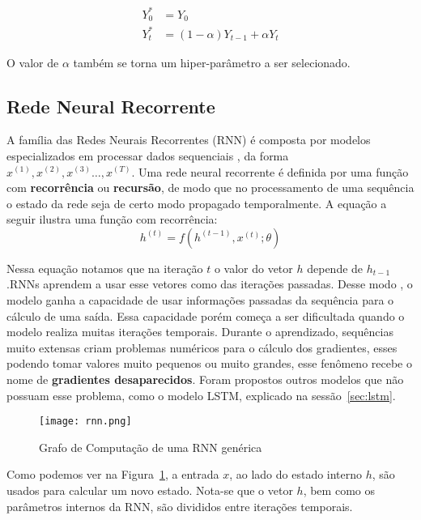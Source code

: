   \begin{align}
  Y^*_0 &= Y_0 \\ 
  Y^*_t &= (1- \alpha)Y_{t-1} + \alpha Y_t 
  \end{align}

  O valor de $\alpha$ também se torna um hiper-parâmetro a ser selecionado.

\subsection{Rede Neural Recorrente}
% 

A família das Redes Neurais Recorrentes (RNN) é composta por modelos especializados
em processar dados sequenciais \citep{dlbook}, da forma $x^{(1)},x^{(2)} ,x^{(3)}\dots ,x^{(T)}$. Uma rede neural recorrente é definida por uma função com
\textbf{recorrência} ou \textbf{recursão}, de modo que no processamento de uma
sequência o estado da rede seja de certo modo propagado temporalmente. A equação
a seguir ilustra uma função com recorrência: \\

\[h^{(t)} = f(h^{(t-1)},x^{(t)};\theta)\]

Nessa equação notamos que na iteração $t$ o valor do vetor $h$ depende de
$h_{t-1}$.RNNs aprendem a usar esse vetores como
 das iterações passadas. Desse modo , o modelo ganha a capacidade
de usar informações passadas da sequência para o cálculo
de uma saída. Essa capacidade porém começa a ser dificultada quando o modelo
realiza muitas iterações temporais. Durante o aprendizado, sequências muito
extensas criam problemas numéricos para o cálculo dos gradientes, esses podendo
tomar valores muito pequenos ou muito grandes, esse fenômeno recebe o nome de
\textbf{gradientes desaparecidos}. Foram propostos outros modelos
que não possuam esse problema, como o modelo LSTM, explicado na sessão~\ref{sec:lstm}. 

\begin{figure}[H]
\centering
\texttt{[image: rnn.png]}
\caption{Grafo de Computação de uma RNN genérica \citep{dlbook}}
\label{fig:rnngraph}
\end{figure}

Como podemos ver na Figura~\ref{fig:rnngraph}, a entrada $x$, ao lado do estado
interno $h$, são usados para calcular um novo estado. Nota-se que o vetor $h$,
bem como os parâmetros internos da RNN, são divididos entre iterações temporais.
\\

